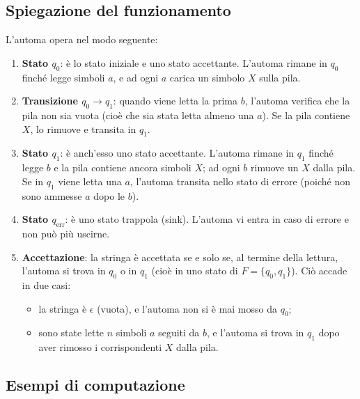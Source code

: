 \documentclass[a4paper,12pt]{article}
\begin{document}
\subsection*{Spiegazione del funzionamento}

L'automa opera nel modo seguente:

\begin{enumerate}
    \item \textbf{Stato $q_0$}: è lo stato iniziale e uno stato accettante. L'automa rimane in $q_0$ finché legge simboli $a$, e ad ogni $a$ carica un simbolo $X$ sulla pila.
    \item \textbf{Transizione $q_0 \to q_1$}: quando viene letta la prima $b$, l'automa verifica che la pila non sia vuota (cioè che sia stata letta almeno una $a$). Se la pila contiene $X$, lo rimuove e transita in $q_1$.
    \item \textbf{Stato $q_1$}: è anch'esso uno stato accettante. L'automa rimane in $q_1$ finché legge $b$ e la pila contiene ancora simboli $X$; ad ogni $b$ rimuove un $X$ dalla pila. Se in $q_1$ viene letta una $a$, l'automa transita nello stato di errore (poiché non sono ammesse $a$ dopo le $b$).
    \item \textbf{Stato $q_{\text{err}}$}: è uno stato trappola (sink). L'automa vi entra in caso di errore e non può più uscirne.
    \item \textbf{Accettazione}: la stringa è accettata se e solo se, al termine della lettura, l'automa si trova in $q_0$ o in $q_1$ (cioè in uno stato di $F = \{q_0, q_1\}$). Ciò accade in due casi:
    \begin{itemize}
        \item la stringa è $\epsilon$ (vuota), e l'automa non si è mai mosso da $q_0$;
        \item sono state lette $n$ simboli $a$ seguiti da $b$, e l'automa si trova in $q_1$ dopo aver rimosso i corrispondenti $X$ dalla pila.
    \end{itemize}
\end{enumerate}


\subsection*{Esempi di computazione}
\end{document}
